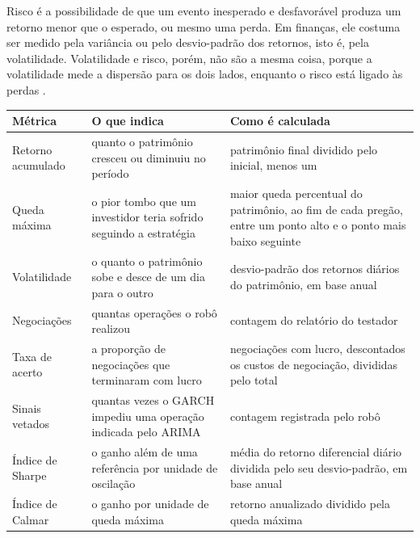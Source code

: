 Risco é a possibilidade de que um evento inesperado e desfavorável produza um
retorno menor que o esperado, ou mesmo uma perda. Em finanças, ele costuma ser
medido pela variância ou pelo desvio-padrão dos retornos, isto é, pela
volatilidade. Volatilidade e risco, porém, não são a mesma coisa, porque a
volatilidade mede a dispersão para os dois lados, enquanto o risco está ligado
às perdas \cite[p.~22-23]{thomaz2019}.

\begin{quadro}[htbp]
\centering
\caption{Métricas de avaliação usadas no trabalho}
\label{qua:metricas}
\fontsize{10}{12}\selectfont
\begin{tabular}{|>{\raggedright\arraybackslash}p{3.0cm}|>{\raggedright\arraybackslash}p{5.2cm}|>{\raggedright\arraybackslash}p{6.2cm}|}
\hline
Métrica & O que indica & Como é calculada \\
\hline
Retorno acumulado & quanto o patrimônio cresceu ou diminuiu no período & patrimônio final dividido pelo inicial, menos um \\
\hline
Queda máxima & o pior tombo que um investidor teria sofrido seguindo a estratégia & maior queda percentual do patrimônio, ao fim de cada pregão, entre um ponto alto e o ponto mais baixo seguinte \\
\hline
Volatilidade & o quanto o patrimônio sobe e desce de um dia para o outro & desvio-padrão dos retornos diários do patrimônio, em base anual \\
\hline
Negociações & quantas operações o robô realizou & contagem do relatório do testador \\
\hline
Taxa de acerto & a proporção de negociações que terminaram com lucro & negociações com lucro, descontados os custos de negociação, divididas pelo total \\
\hline
Sinais vetados & quantas vezes o GARCH impediu uma operação indicada pelo ARIMA & contagem registrada pelo robô \\
\hline
Índice de Sharpe & o ganho além de uma referência por unidade de oscilação & média do retorno diferencial diário dividida pelo seu desvio-padrão, em base anual \\
\hline
Índice de Calmar & o ganho por unidade de queda máxima & retorno anualizado dividido pela queda máxima \\
\hline
\end{tabular}
\end{quadro}

